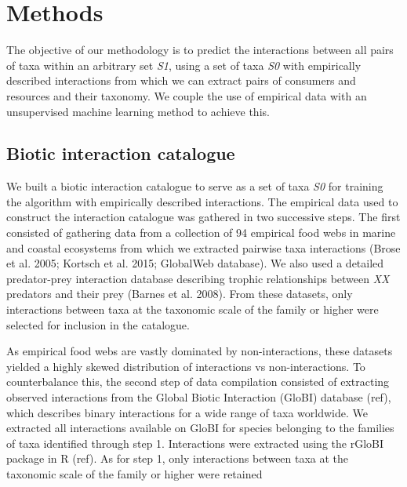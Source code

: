 \documentclass[letterpaper]{article}
\begin{document}
\section{Methods}
The objective of our methodology is to predict the interactions between all pairs of taxa within an arbitrary set \textit{S1}, using a set of taxa \textit{S0} with empirically described interactions from which we can extract pairs of consumers and resources and their taxonomy. We couple the use of empirical data with an unsupervised machine learning method to achieve this.

 \subsection{Biotic interaction catalogue}

We built a biotic interaction catalogue to serve as a set of taxa \textit{S0} for training the algorithm with empirically described interactions. The empirical data used to construct the interaction catalogue was gathered in two successive steps. The first consisted of gathering data from a collection of 94 empirical food webs in marine and coastal ecosystems from which we extracted pairwise taxa interactions (Brose et al. 2005; Kortsch et al. 2015; GlobalWeb database). We also used a detailed predator-prey interaction database describing trophic relationships between \textit{XX} predators and their prey (Barnes et al. 2008). From these datasets, only interactions between taxa at the taxonomic scale of the family or higher were selected for inclusion in the catalogue.

As empirical food webs are vastly dominated by non-interactions, these datasets yielded a highly skewed distribution of interactions vs non-interactions. To counterbalance this, the second step of data compilation consisted of extracting observed interactions from the Global Biotic Interaction (GloBI) database (ref), which describes binary interactions for a wide range of taxa worldwide. We extracted all interactions available on GloBI for species belonging to the families of taxa identified through step 1. Interactions were extracted using the rGloBI package in R (ref). As for step 1, only interactions between taxa at the taxonomic scale of the family or higher were retained
\end{document}
